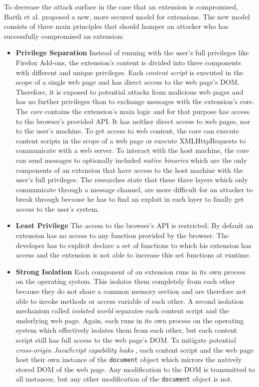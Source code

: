 	To decrease the attack surface in the case that an extension is compromised, Barth et al. proposed a new, more secured model for extensions. The new model consists of three main principles that should hamper an attacker who has successfully compromised an extension: 
	
	\begin{itemize}
		\item \textbf{Privilege Separation} Instead of running with the user's full privileges like Firefox Add-ons, the extension's content is divided into three components with different and unique privileges. Each \textit{content script} is executed in the scope of a single web page and has direct access to the web page's DOM. Therefore, it is exposed to potential attacks from malicious web pages and has no further privileges than to exchange messages with the extension's core. The \textit{core} contains the extension's main logic and for that purpose has access to the browser's provided API. It has neither direct access to web pages, nor to the user's machine. To get access to web content, the core can execute content scripts in the scope of a web page or execute XMLHttpRequests to communicate with a web server. To interact with the host machine, the core can send messages to optionally included \textit{native binaries} which are the only components of an extension that have access to the host machine with the user's full privileges. The researches state that these three layers which only communicate through a message channel, are more difficult for an attacker to break through because he has to find an exploit in each layer to finally get access to the user's system.
		\item \textbf{Least Privilege} The access to the browser's API is restricted. By default an extension has no access to any function provided by the browser. The developer has to explicit declare a set of functions to which his extension has access and the extension is not able to increase this set functions at runtime.
		\item \textbf{Strong Isolation} Each component of an extension runs in its own process on the operating system. This isolates them completely from each other because they do not share a common memory section and are therefore not able to invoke methods or access variable of each other. A second isolation mechanism called \textit{isolated world} separates each content script and the underlying web page. Again, each runs in its own process on the operating system which effectively isolates them from each other, but each content script still has full access to the web page's DOM. To mitigate potential \textit{cross-origin JavaScript capability leaks} \cite{Barth:2009:CJC:1855768.1855780}, each content script and the web page host their own instance of the \texttt{document} object which mirrors the natively stored DOM of the web page. Any modification to the DOM is transmitted to all instances, but any other modification of the \texttt{document} object is not. 
	\end{itemize}
	
